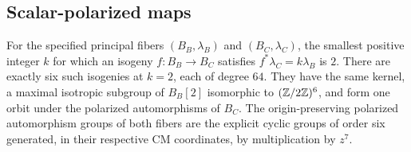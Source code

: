 \subsection{Scalar-polarized maps}
\begin{proposition}
\label{pp:prop:bcisogeny}
For the specified principal fibers $(B_B,\lambda_B)$ and
$(B_C,\lambda_C)$, the smallest positive integer $k$ for which an
isogeny $f:B_B\to B_C$ satisfies $f^*\lambda_C=k\lambda_B$ is $2$.
There are exactly six such isogenies at $k=2$, each of degree $64$.
They have the same kernel, a maximal isotropic subgroup of $B_B[2]$
isomorphic to $(\mathbb Z/2\mathbb Z)^6$, and form one orbit under the polarized
automorphisms of $B_C$. The origin-preserving polarized automorphism
groups of both fibers are the explicit cyclic groups of order six
generated, in their respective CM coordinates, by multiplication by $z^7$.
\end{proposition}
